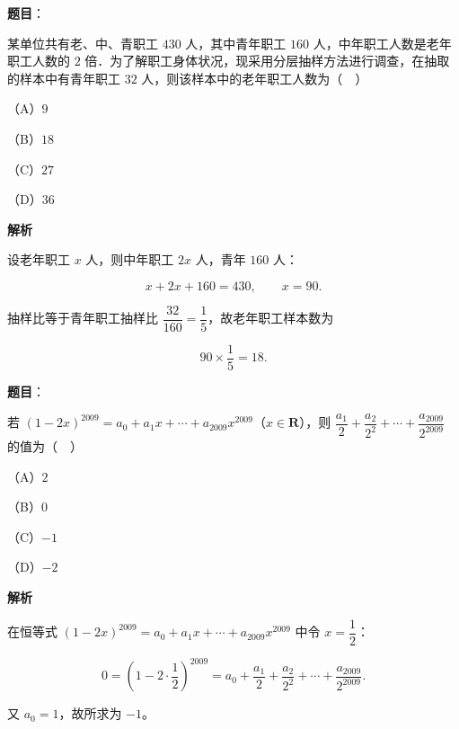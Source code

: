 \begin{answer}

\textbf{题目}：

某单位共有老、中、青职工 $430$ 人，其中青年职工 $160$ 人，中年职工人数是老年职工人数的 $2$ 倍．为了解职工身体状况，现采用分层抽样方法进行调查，在抽取的样本中有青年职工 $32$ 人，则该样本中的老年职工人数为（　）

（A）$9$

（B）$18$

（C）$27$

（D）$36$

\textbf{解析}

设老年职工 $x$ 人，则中年职工 $2x$ 人，青年 $160$ 人：

\nopagebreak[4]
\[x+2x+160=430,\qquad x=90.\]

抽样比等于青年职工抽样比 $\dfrac{32}{160}=\dfrac15$，故老年职工样本数为

\nopagebreak[4]
\[90\times\frac15=18.\]


\end{answer}
\begin{answer}

\textbf{题目}：

若 $(1-2x)^{2009}=a_0+a_1x+\cdots+a_{2009}x^{2009}$（$x\in\mathbf R$），则 $\dfrac{a_1}2+\dfrac{a_2}{2^2}+\cdots+\dfrac{a_{2009}}{2^{2009}}$ 的值为（　）

（A）$2$

（B）$0$

（C）$-1$

（D）$-2$

\textbf{解析}

在恒等式 $(1-2x)^{2009}=a_0+a_1x+\cdots+a_{2009}x^{2009}$ 中令 $x=\dfrac12$：

\nopagebreak[4]
\[0=\left(1-2\cdot\frac12\right)^{2009}=a_0+\frac{a_1}2+\frac{a_2}{2^2}+\cdots+\frac{a_{2009}}{2^{2009}}.\]

又 $a_0=1$，故所求为 $-1$。


\end{answer}
